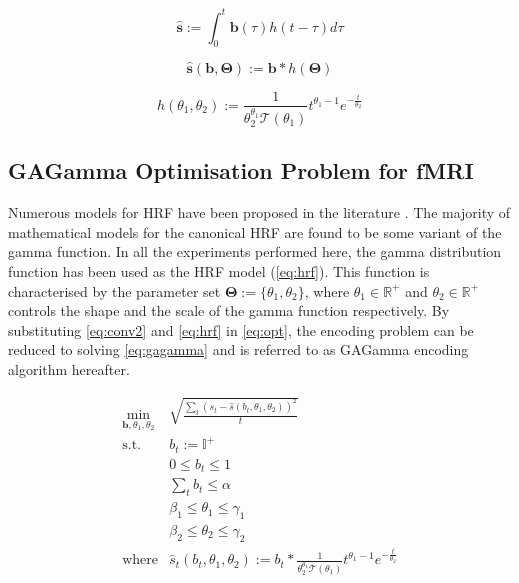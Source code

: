 \begin{equation}
\label{eq:conv1}
\displaystyle \mathbf{\hat{s}}:=\int_0^t \mathbf{b}(\tau)h(t-\tau)d\tau
\end{equation}

\begin{equation}
\label{eq:conv2}
\displaystyle \mathbf{\hat{s}}(\mathbf{b}, \mathbf{\Theta}):=\mathbf{b}\ast h(\mathbf{\Theta})
\end{equation}

\begin{equation}
\label{eq:hrf}
h(\theta_1, \theta_2):=\frac{1}{\theta_2^{\theta_1}\mathcal{T}(\theta_1)}t^{\theta_1-1}e^{-\frac{t}{\theta_2}}
\end{equation}
\subsection{GAGamma Optimisation Problem for fMRI}
Numerous models for HRF have been proposed in the literature \citep{boynton1996linear,friston1998nonlinear,glover1999deconvolution}. The majority of mathematical models for the canonical HRF are found to be some variant of the gamma function. In all the experiments performed here, the gamma distribution function has been used as the HRF model (\equationname \ref{eq:hrf}). This function is characterised by the parameter set $\displaystyle \mathbf{\Theta}:=\{\theta_1, \theta_2\}$, where $\theta_1\in \mathbb{R^+}$ and $\theta_2\in \mathbb{R^+}$ controls the shape and the scale of the gamma function respectively. By substituting \equationnames \ref{eq:conv2} and \ref{eq:hrf} in \equationname \ref{eq:opt}, the encoding problem can be reduced to solving \equationname \ref{eq:gagamma} and is referred to as GAGamma encoding algorithm hereafter.

\begin{equation}
\begin{matrix}
\displaystyle \min_{\mathbf{b},\theta_1, \theta_2} &  \displaystyle \sqrt{\frac{\sum_t(s_t-\hat{s}(b_t,\theta_1, \theta_2))^2}{t}} \\
\textrm{s.t.} & \displaystyle b_t:=\mathbb{I}^+ \\
& \displaystyle 0\leq b_t\leq 1\\ 
& \displaystyle \sum_t b_t\leq \alpha  \\
& \displaystyle \beta_1\leq \theta_1\leq \gamma_1 \\ 
& \displaystyle \beta_2\leq \theta_2\leq \gamma_2 \\

\textrm{where} & \displaystyle \hat{s}_t(b_t,\theta_1,\theta_2):=b_t\ast \frac{1}{\theta_2^{\theta_1}\mathcal{T}(\theta_1)}t^{\theta_1-1}e^{-\frac{t}{\theta_2}}
\end{matrix}
\label{eq:gagamma}
\end{equation}

